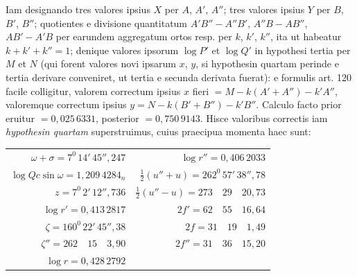 Iam designando tres valores ipsius $X$ per $A$, $A'$, $A''$; tres valores ipsius $Y$
per $B$, $B'$, $B''$; quotientes e divisione quantitatum $A'B''-A''B'$, $A''B-AB''$,
$AB'-A'B$ per earundem aggregatum ortos resp. per $k$, $k'$, $k''$, ita ut habeatur $k+k'+k''=1$; denique valores ipsorum $\log P'$ et $\log Q'$ in hypothesi
tertia per $M$ et $N$ (qui forent valores novi ipsarum $x$, $y$, si hypothesin
quartam perinde e tertia derivare conveniret, ut tertia e secunda derivata
fuerat): e formulis art. 120 facile colligitur, valorem correctum ipsius $x$ fieri
$=M-k(A'+A'')-k'A''$, valoremque correctum ipsius $y = N-k(B'+B'')-k'B''$.
Calculo facto prior eruitur $=0{,}025\,6331$, posterior $=0{,}750\,9143$. Hisce valoribus correctis iam \emph{hypothesin quartam} superstruimus, cuius praecipua momenta haec sunt:
\begin{center}\begingroup\footnotesize\setlength{\tabcolsep}{3pt}\renewcommand{\arraystretch}{1.3}
\begin{tabular}{r|r}
$\omega + \sigma=7^0\,14'\,45''{,}247$ & $\log r''=0{,}406\,2033$\\
$\log Qc\sin\omega=1{,}209\,4284_n$ & $\tfrac12(u''+u)=262^0\,57'\,38''{,}78$\\
$z=7^0\,2'\,12''{,}736$ & $\tfrac12(u''-u)=273\quad29\quad20{,}73$\\
$\log r'=0{,}413\,2817$ & $2f'=62\quad55\quad16{,}64$\\
$\zeta=160^0\,22'\,45''{,}38$ & $2f=31\quad19\quad1{,}49$\\
$\zeta''=262\quad15\quad3{,}90$ & $2f''=31\quad36\quad15{,}20$\\
$\log r=0{,}428\,2792$ & \\
\end{tabular}
\endgroup\end{center}


